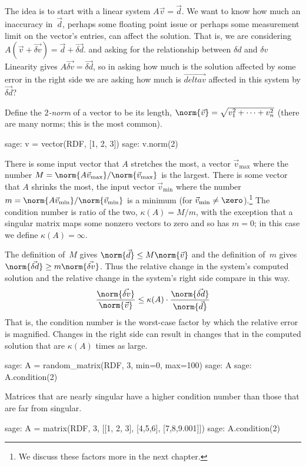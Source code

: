 The idea is to start with a linear system 
$A\vec{v}=\vec{d}$.
We want to know how much an inaccuracy in~$\vec{d}$, perhaps some
floating point issue or perhaps some measurement limit on the vector's entries, 
can affect the solution.
That is, we are considering
$A(\vec{v}+\vec{\delta v})=\vec{d}+\vec{\delta d}$.
and asking for the relationship between $\delta d$ and $\delta v$
Linearity gives $A\vec{\delta v}=\vec{\delta d}$, so in asking 
how much is the solution affected by some error in the right side we are
asking
how much is $\vec{delta v}$ affected in this system by $\vec{\delta d}$?

Define the \textit{$2$-norm} of a vector to be 
its length,
  $\norm{\vec{v}}=\sqrt{v_1^2+\cdots+v_n^2}$
(there are many norms; this is the most common).
\begin{sagecommandline}
sage: v = vector(RDF, [1, 2, 3])
sage: v.norm(2)
\end{sagecommandline}
There is some input vector that $A$ stretches
the most, a vector $\vec{v}_{\text{max}}$
where the number $M=\norm{A\vec{v}_{\text{max}}}/\norm{\vec{v}_{\text{max}}}$ 
is the largest.
There is some vector that $A$ shrinks the most, the 
input vector $\vec{v}_{\text{min}}$ 
where the number
$m=\norm{A\vec{v}_{\text{min}}}/\norm{\vec{v}_{\text{min}}}$ is a minimum 
(for $\vec{v}_{\text{min}}\neq\zero$).\footnote{%
  We discuss these factors more in the next chapter.}
The condition number is ratio of the two, 
$\kappa(A)=M/m$, with the exception 
that a singular matrix maps some nonzero vectors to zero and
so has $m=0$; in this case we define $\kappa(A)=\infty$.

The definition of~$M$ gives $\norm{\vec{d}}\leq M\norm{\vec{v}}$ and
the definition of~$m$ gives $\norm{\vec{\delta d}}\geq m\norm{\vec{\delta v}}$.
Thus the relative change in the 
system's computed solution
and the relative change in the system's right side
compare in this way. 
\begin{equation*}
  \frac{\norm{\vec{\delta v}}}{\norm{\vec{v}}}
   \leq \kappa(A)\cdot \frac{\norm{\vec{\delta d}}}{\norm{\vec{d}}}
\end{equation*}
That is, the condition number is the worst-case factor by which the
relative error is magnified. 
Changes in the right side can result in changes 
that in the computed solution that are $\kappa(A)$ times as large.
\begin{sagecommandline}
sage: A = random_matrix(RDF, 3, min=0, max=100)
sage: A
sage: A.condition(2)
\end{sagecommandline}
Matrices that are nearly singular have a higher condition number than
those that are far from singular.
\begin{sagecommandline}
sage: A = matrix(RDF, 3, [[1, 2, 3], [4,5,6], [7,8,9.001]])
sage: A.condition(2)
\end{sagecommandline}






